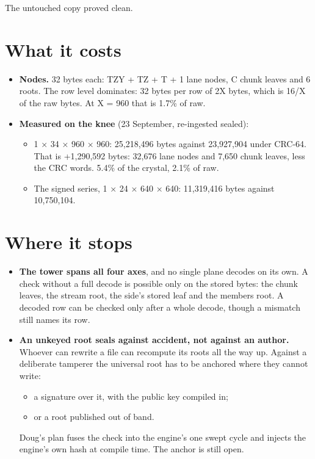 The untouched copy proved clean.

\section{\texorpdfstring{What it costs}{What it costs}}

\begin{itemize}
\item \textbf{Nodes.} 32 bytes each: TZY + TZ + T + 1 lane nodes, C chunk leaves and 6 roots. The row level dominates: 32 bytes per row of 2X bytes, which is 16/X of the raw bytes. At X = 960 that is 1.7\% of raw.
\item \textbf{Measured on the knee} (23 September, re-ingested sealed):

\begin{itemize}
\item 1 × 34 × 960 × 960: 25,218,496 bytes against 23,927,904 under CRC-64. That is +1,290,592 bytes: 32,676 lane nodes and 7,650 chunk leaves, less the CRC words. 5.4\% of the crystal, 2.1\% of raw.
\item The signed series, 1 × 24 × 640 × 640: 11,319,416 bytes against 10,750,104.
\end{itemize}
\end{itemize}

\section{\texorpdfstring{Where it stops}{Where it stops}}

\begin{itemize}
\item \textbf{The tower spans all four axes}, and no single plane decodes on its own. A check without a full decode is possible only on the stored bytes: the chunk leaves, the stream root, the side's stored leaf and the members root. A decoded row can be checked only after a whole decode, though a mismatch still names its row.
\item \textbf{An unkeyed root seals against accident, not against an author.} Whoever can rewrite a file can recompute its roots all the way up. Against a deliberate tamperer the universal root has to be anchored where they cannot write:

\begin{itemize}
\item a signature over it, with the public key compiled in;
\item or a root published out of band.
\end{itemize}

Doug's plan fuses the check into the engine's one swept cycle and injects the engine's own hash at compile time. The anchor is still open.
\end{itemize}

